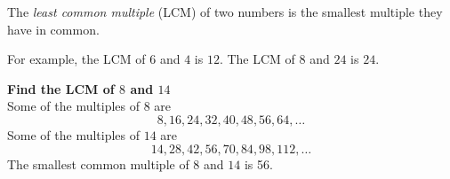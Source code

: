 \begin{definition} 
The \emph{least common multiple} (LCM) of two numbers is the smallest multiple they have in common.  

For example, the LCM of \(6\) and \(4\) is \(12\).  The LCM of \(8\) and \(24\) is \(24\).   
\end{definition}
\begin{example}\textbf{Find the LCM of \(8\) and \(14\)}
\\
Some of the multiples of \(8\) are 
	\[8, 16, 24, 32, 40, 48, 56, 64, \dots \]
Some of the multiples of \(14\) are 
	\[14, 28, 42, 56, 70, 84, 98, 112, \dots \]	
The smallest common multiple of \(8\) and \(14\) is 56.  
\end{example}

\newpage 

\vspace*{25mm} 
\newcommand*{\xMin}{0}%
\newcommand*{\xMax}{10}%
\newcommand*{\yMin}{0}%
\newcommand*{\yMax}{10}%
\hspace{-15mm}



\newpage 
